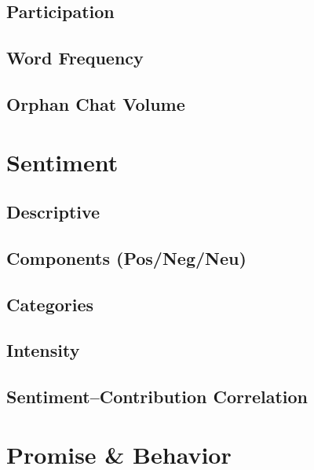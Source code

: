 \documentclass[11pt, landscape]{article}
\begin{document}
\subsection{Participation}


\subsection{Word Frequency}


\subsection{Orphan Chat Volume}


\newpage

\section{Sentiment}

\subsection{Descriptive}


\subsection{Components (Pos/Neg/Neu)}


\subsection{Categories}


\subsection{Intensity}


\subsection{Sentiment--Contribution Correlation}


\newpage

\section{Promise \& Behavior}
\end{document}
